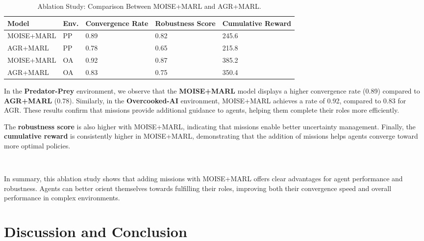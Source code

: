 \documentclass[sigconf,anonymous]{aamas}
\begin{document}
\begin{table}[h!]
    \centering
    \caption{Ablation Study: Comparison Between MOISE+MARL and AGR+MARL.}
    \label{tab:ablation_study}
    \small %
    \renewcommand{\arraystretch}{1.1} %
    \begin{tabular}{p{1.7cm}p{0.7cm}p{1.4cm}p{1.4cm}p{1.4cm}}
        \hline
        \textbf{Model} & \textbf{Env.} & \textbf{Convergence Rate} & \textbf{Robustness Score} & \textbf{Cumulative Reward} \\ \hline
        MOISE+MARL & PP & 0.89 & 0.82 & 245.6 \\
        AGR+MARL & PP & 0.78 & 0.65 & 215.8 \\
        MOISE+MARL & OA & 0.92 & 0.87 & 385.2 \\
        AGR+MARL & OA & 0.83 & 0.75 & 350.4 \\ \hline
    \end{tabular}
\end{table}

In the \textbf{Predator-Prey} environment, we observe that the \textbf{MOISE+MARL} model displays a higher convergence rate (0.89) compared to \textbf{AGR+MARL} (0.78). Similarly, in the \textbf{Overcooked-AI} environment, MOISE+MARL achieves a rate of 0.92, compared to 0.83 for AGR. These results confirm that missions provide additional guidance to agents, helping them complete their roles more efficiently.

The \textbf{robustness score} is also higher with MOISE+MARL, indicating that missions enable better uncertainty management. Finally, the \textbf{cumulative reward} is consistently higher in MOISE+MARL, demonstrating that the addition of missions helps agents converge toward more optimal policies.

\

In summary, this ablation study shows that adding missions with MOISE+MARL offers clear advantages for agent performance and robustness. Agents can better orient themselves towards fulfilling their roles, improving both their convergence speed and overall performance in complex environments.


\section{Discussion and Conclusion}
\label{sec:discussion_conclusion}

\end{document}
